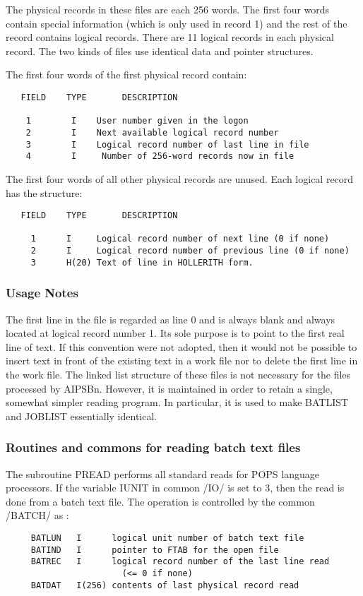      The physical records in these files are each 256 words.  The
first four words contain special information (which is only used in
record 1) and the rest of the record contains logical records.  There
are 11 logical records in each physical record.  The two kinds of
files use identical data and pointer structures.

     The first four words of the first physical record contain:
\begin{verbatim}
   FIELD    TYPE       DESCRIPTION

    1        I    User number given in the logon
    2        I    Next available logical record number
    3        I    Logical record number of last line in file
    4        I     Number of 256-word records now in file
\end{verbatim}

The first four words of all other physical records are unused.  Each
logical record has the structure:
\begin{verbatim}
   FIELD    TYPE       DESCRIPTION

     1      I     Logical record number of next line (0 if none)
     2      I     Logical record number of previous line (0 if none)
     3      H(20) Text of line in HOLLERITH form.
\end{verbatim}



\subsubsection{Usage Notes}


     The first line in the file is regarded as line 0 and is always
blank and always located at logical record number 1.  Its sole purpose
is to point to the first real line of text.  If this convention were
not adopted, then it would not be possible to insert text in front of
the existing text in a work file nor to delete the first line in the
work file.  The linked list structure of these files is not necessary
for the files processed by AIPSBn.  However, it is maintained in order
to retain a single, somewhat simpler reading program.  In particular,
it is used to make BATLIST and JOBLIST essentially identical.


\subsubsection{Routines and commons for reading batch text files}


     The subroutine PREAD performs all standard reads for POPS
language processors.  If the variable IUNIT in common /IO/ is set to
3, then the read is done from a batch text file.  The operation is
controlled by the common /BATCH/ as :
\begin{verbatim}
     BATLUN   I      logical unit number of batch text file
     BATIND   I      pointer to FTAB for the open file
     BATREC   I      logical record number of the last line read
                       (<= 0 if none)
     BATDAT   I(256) contents of last physical record read
\end{verbatim}

